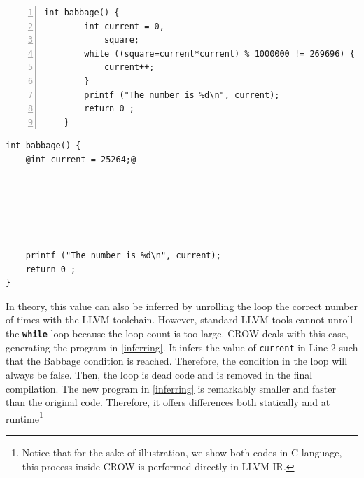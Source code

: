 {


\begin{minipage}[t]{0.42\linewidth}
    \begin{lstlisting}[numbers=left]
    int babbage() {
        int current = 0,
            square;
        while ((square=current*current) % 1000000 != 269696) {
            current++;
        }
        printf ("The number is %d\n", current);
        return 0 ;
    }
    \end{lstlisting}
\end{minipage}
\begin{minipage}[t]{0.48\linewidth}
    \begin{lstlisting}[]
int babbage() {
    @int current = 25264;@
    
    




    printf ("The number is %d\n", current);
    return 0 ;
}
    \end{lstlisting}
\end{minipage}
}
In theory, this value can also be inferred by unrolling the loop the correct number of times with the LLVM toolchain.
However, standard LLVM tools cannot unroll the \texttt{\textbf{while}}-loop because the loop count is too large.
CROW deals with this case, generating the program in \autoref{inferring}. It infers the value of \texttt{current} in Line 2 such that the Babbage condition is reached. Therefore, the condition in the loop will always be false. Then, the loop is dead code and is removed in the final compilation. 
The new program in \autoref{inferring} is remarkably smaller and faster than the original code. Therefore, it offers differences both statically and at runtime\footnote{ Notice that for the sake of illustration, we show both codes in C language, this process inside CROW is performed directly in LLVM IR.}


